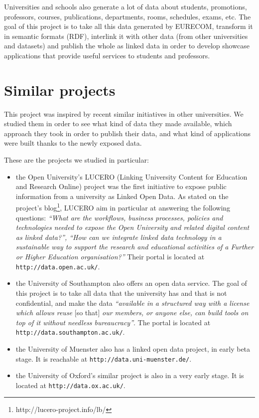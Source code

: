 \documentclass[a4paper,11pt]{report}
\begin{document}
Universities and schools also generate a lot of data about students, promotions, professors, courses, publications, departments, rooms, schedules, exams, etc. The goal of this project is to take all this data generated by \mbox{EURECOM}, transform it in semantic formats (RDF), interlink it with other data (from other universities and datasets) and publish the whole as linked data in order to develop showcase applications that provide useful services to students and professors. %


\chapter{Similar projects}

This project was inspired by recent similar initiatives in other universities. We studied them in order to see what kind of data they made available, which approach they took in order to publish their data, and what kind of applications were built thanks to the newly exposed data. 

These are the projects we studied in particular:
\begin{itemize}
\item the Open University's LUCERO (Linking University Content for Education and Research Online) project was the first initiative to expose public information from a university as Linked Open Data. As stated on the project's blog\footnote{http://lucero-project.info/lb/}, LUCERO aim in particular at answering the following questions: \emph{``What are the workflows, business processes, policies and technologies needed to expose the Open University and related digital content as linked data?'', ``How can we integrate linked data technology in a sustainable way to support the research and educational activities of a Further or Higher Education organisation?''} Their portal is located at \texttt{http://data.open.ac.uk/}.  
\item the University of Southampton also offers an open data service. The goal of this project is to take all data that the university has and that is not confidential, and make the data \emph{``available in a structured way with a license which allows reuse} [so that] \emph{our members, or anyone else, can build tools on top of it without needless bureaucracy''}. The portal is located at \texttt{http://data.southampton.ac.uk/}.
\item the University of Muenster also has a linked open data project, in early beta stage. It is reachable at  \texttt{http://data.uni-muenster.de/}.
\item the University of Oxford's similar project is also in a very early stage. It is located at  \texttt{http://data.ox.ac.uk/}.
\end{itemize}
\end{document}
